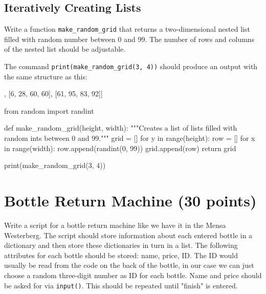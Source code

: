 \subsection{Iteratively Creating Lists}

Write a function \texttt{make\_random\_grid} that returns a two-dimensional nested list filled with random number between 0 and 99. The number of rows and columns of the nested list should be adjustable.

\vspace{1em}

\noindent The command \texttt{print(make\_random\_grid(3, 4))} should produce an output with the same structure as this:

\begin{outputcode}
[[80, 40, 6, 12], [6, 28, 60, 60], [61, 95, 83, 92]]
\end{outputcode}

\begin{solution}
	\begin{pythoncode}
from random import randint

def make_random_grid(height, width):
	"""Creates a list of lists filled with random ints between 0 and 99."""
	grid = []
	for y in range(height):
		row = []
		for x in range(width):
			row.append(randint(0, 99))
		grid.append(row)
	return grid

print(make_random_grid(3, 4))
	\end{pythoncode}
\end{solution}

\section{Bottle Return Machine (30 points)}

Write a script for a bottle return machine like we have it in the Mensa Westerberg. The script should store information about each entered bottle in a dictionary and then store these dictionaries in turn in a list. \newline The following attributes for each bottle should be stored: name, price, ID.
\newline The ID would usually be read from the code on the back of the bottle, in our case we can just choose a random three-digit number as ID for each bottle. Name and price should be asked for via \texttt{input()}. This should be repeated until "finish" is entered.

\vspace{1em}

